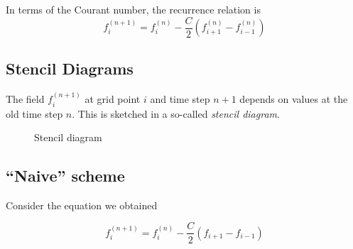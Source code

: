 In terms of the Courant number, the recurrence relation is 
\begin{equation}
f^{(n+1)}_i  = f^{(n)}_i - \frac{C}{2} \left( f^{(n)}_{i+1} - f^{(n)}_{i-1}\right)
\end{equation}


\subsection{Stencil Diagrams}

The field $f_i^{(n+1)}$ at grid point $i$ and time step $n + 1$
depends on values at the old time step $n$. This is sketched in a
so-called {\it stencil diagram}. 

\begin{figure}
  \begin{center}
  \end{center}
  \caption[]{Stencil diagram}
  \label{fig:stencil1}
\end{figure}

\subsection{``Naive'' scheme}




Consider the equation we obtained 

\begin{equation}
f^{(n+1)}_i  = f^{(n)}_i - \frac{C}{2}\left(f_{i+1} - f_{i-1}\right)
\end{equation}


